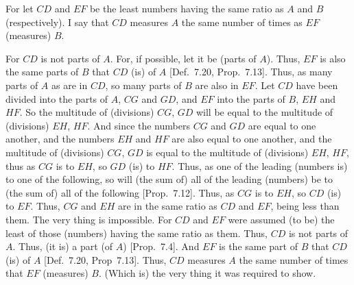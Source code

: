 \begin{Parallel}{}{}
{For let $CD$ and $EF$ be the least numbers having the same ratio as $A$ and
$B$ (respectively). I say that $CD$ measures $A$ the same number of times
as $EF$ (measures) $B$.

\epsfysize=2in
\centerline{}

For $CD$ is not parts of $A$. For, if possible, let it be (parts of $A$). Thus,
$EF$ is also the same parts of $B$ that $CD$ (is) of $A$  [Def.~7.20, Prop.~7.13]. Thus, as many parts of $A$ as
are in $CD$, so many parts of $B$ are also in $EF$.  Let $CD$ have
been divided into the parts of $A$, $CG$ and $GD$, and $EF$ into the
parts of $B$, $EH$ and $HF$. So the multitude of (divisions) $CG$, $GD$
will be equal to the multitude of (divisions) $EH$, $HF$. And since the
numbers $CG$ and $GD$ are equal to one another, and the numbers
$EH$ and $HF$ are also equal to one another, and the multitude of (divisions)
$CG$, $GD$ is equal to the multitude of (divisions) $EH$, $HF$, thus as $CG$ is to $EH$, so
$GD$ (is) to $HF$. Thus,  as one of the
leading (numbers is) to one of the following, so will (the sum of) all
of the leading (numbers)  be  to (the sum of) all of the following [Prop.~7.12].  Thus, as $CG$ is to $EH$,
so $CD$ (is) to $EF$. Thus, $CG$ and $EH$ are in the same ratio as
$CD$ and $EF$, being less than them. The very thing is impossible. For
$CD$ and $EF$ were assumed (to be) the least of those (numbers) having
the same ratio as them. Thus, $CD$ is not parts of $A$. Thus, (it is) a
part (of $A$) [Prop.~7.4]. And $EF$ is the same part of $B$ that $CD$ (is) of $A$ [Def.~7.20, Prop~7.13]. Thus, $CD$ measures $A$ the same number of times that $EF$ (measures) $B$. (Which is) the very thing it was required to
show.}
\end{Parallel}

